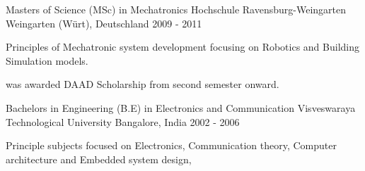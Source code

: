 

\begin{cventries}

  \cventry
    {Masters of Science (MSc) in Mechatronics} %
    {Hochschule Ravensburg-Weingarten} %
    {Weingarten (Würt), Deutschland} %
    {2009 - 2011} %
    {
      \begin{cvitems} %
        \item {Principles of Mechatronic system development focusing on Robotics and Building Simulation models.}
        \item {was awarded DAAD Scholarship from second semester onward.}
      \end{cvitems}
    }


  \cventry
    {Bachelors in Engineering (B.E) in Electronics and Communication} %
    {Visveswaraya Technological University} %
    {Bangalore, India} %
    {2002 - 2006} %
    {
      \begin{cvitems} %
      \item {Principle subjects focused on Electronics, Communication theory, Computer architecture and Embedded system design,}
      \end{cvitems}
    }

\end{cventries}
